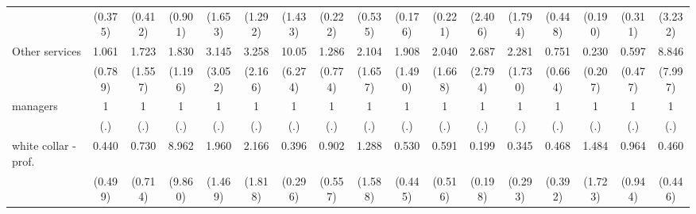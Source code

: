 {\begin{tabular}{l*{16}{c}}
                    &     (0.375)         &     (0.412)         &     (0.901)         &     (1.653)         &     (1.292)         &     (1.433)         &     (0.222)         &     (0.535)         &     (0.176)         &     (0.221)         &     (2.406)         &     (1.794)         &     (0.448)         &     (0.190)         &     (0.311)         &     (3.232)         \\
[1em]
Other services      &       1.061         &       1.723         &       1.830         &       3.145         &       3.258         &       10.05\sym{***}&       1.286         &       2.104         &       1.908         &       2.040         &       2.687         &       2.281         &       0.751         &       0.230         &       0.597         &       8.846\sym{*}  \\
                    &     (0.789)         &     (1.557)         &     (1.196)         &     (3.052)         &     (2.166)         &     (6.274)         &     (0.774)         &     (1.657)         &     (1.490)         &     (1.668)         &     (2.794)         &     (1.730)         &     (0.664)         &     (0.207)         &     (0.477)         &     (7.997)         \\
[1em]
managers            &           1         &           1         &           1         &           1         &           1         &           1         &           1         &           1         &           1         &           1         &           1         &           1         &           1         &           1         &           1         &           1         \\
                    &         (.)         &         (.)         &         (.)         &         (.)         &         (.)         &         (.)         &         (.)         &         (.)         &         (.)         &         (.)         &         (.)         &         (.)         &         (.)         &         (.)         &         (.)         &         (.)         \\
[1em]
white collar - prof.&       0.440         &       0.730         &       8.962\sym{*}  &       1.960         &       2.166         &       0.396         &       0.902         &       1.288         &       0.530         &       0.591         &       0.199         &       0.345         &       0.468         &       1.484         &       0.964         &       0.460         \\
                    &     (0.499)         &     (0.714)         &     (9.860)         &     (1.469)         &     (1.818)         &     (0.296)         &     (0.557)         &     (1.588)         &     (0.445)         &     (0.516)         &     (0.198)         &     (0.293)         &     (0.392)         &     (1.723)         &     (0.944)         &     (0.446)         \\

\end{tabular}}
